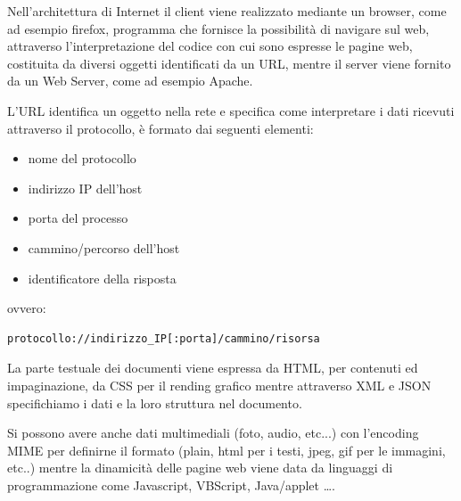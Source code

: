 \documentclass[a4paper,12pt, oneside]{book}
\begin{document}
Nell'architettura di Internet il client viene realizzato mediante un browser, come ad esempio firefox,
programma che fornisce la possibilità di navigare sul web, attraverso l'interpretazione del codice
con cui sono espresse le pagine web, costituita da diversi oggetti identificati da un URL, mentre
il server viene fornito da un Web Server, come ad esempio Apache.

L'URL identifica un oggetto nella rete e specifica come interpretare i dati ricevuti 
attraverso il protocollo, è formato dai seguenti elementi:
\begin{itemize}
    \item nome del protocollo 
    \item indirizzo IP dell'host
    \item porta del processo
    \item cammino/percorso dell'host
    \item identificatore della risposta
\end{itemize}
ovvero: \begin{verbatim}
protocollo://indirizzo_IP[:porta]/cammino/risorsa
\end{verbatim}
La parte testuale dei documenti viene espressa da HTML, per contenuti ed impaginazione, da CSS per 
il rending grafico mentre attraverso XML e JSON specifichiamo i dati e la loro struttura nel documento.

Si possono avere anche dati multimediali (foto, audio, etc...) con l'encoding MIME per definirne 
il formato (plain, html per i testi, jpeg, gif per le immagini, etc..) mentre la dinamicità delle pagine web
viene data da linguaggi di programmazione come Javascript, VBScript, Java/applet \dots .
\end{document}
